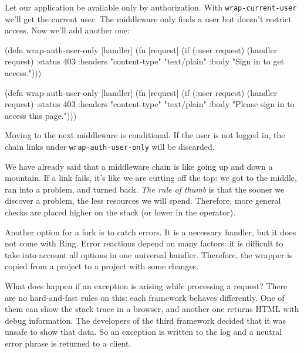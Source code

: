 Let our application be available only by authorization. With \verb|wrap-current-user| we'll get the current user. The middleware only finds a user but doesn't restrict access. Now we'll add another one:


\ifx\DEVICETYPE\MOBILE

\begin{clojure}
(defn wrap-auth-user-only [handler]
  (fn [request]
    (if (:user request)
      (handler request)
      {:status 403
       :headers
       {"content-type" "text/plain"}
       :body "Sign in to get access."})))
\end{clojure}

\else

\begin{clojure}
(defn wrap-auth-user-only [handler]
  (fn [request]
    (if (:user request)
      (handler request)
      {:status 403
       :headers {"content-type" "text/plain"}
       :body "Please sign in to access this page."})))
\end{clojure}

\fi

Moving to the next middleware is conditional. If the user is not logged in, the chain links under \verb|wrap-auth-user-only| will be discarded.

We have already said that a middleware chain is like going up and down a mountain. If a link fails, it’s like we are cutting off the top: we got to the middle, ran into a problem, and turned back. \emph{The rule of thumb} is that the sooner we discover a problem, the less resources we will spend. Therefore, more general checks are placed higher on the stack (or lower in the \arr operator).


Another option for a fork is to catch errors. It is a necessary handler, but it does not come with Ring. Error reactions depend on many factors: it is difficult to take into account all options in one universal handler. Therefore, the wrapper is copied from a project to a project with some changes.

What does happen if an exception is arising while processing a request? There are no hard-and-fast rules on this: each framework behaves differently. One of them can show the stack trace in a browser, and another one returns HTML with debug information. The developers of the third framework decided that it was unsafe to show that data. So an exception is written to the log and a neutral error phrase is returned to a client.

